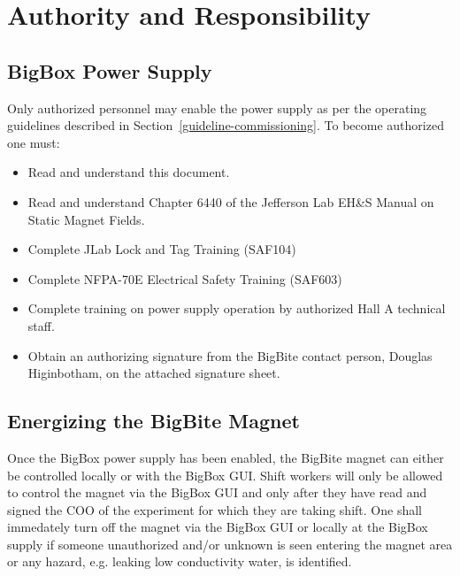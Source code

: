 \section{Authority and Responsibility}

\subsection{BigBox Power Supply}

Only authorized personnel may enable the power supply as per the operating
guidelines described in Section~\ref{guideline-commissioning}.  To become authorized one must:

\begin{itemize}

\item{Read and understand this document.}

\item{Read and understand Chapter 6440 of the Jefferson Lab EH\&S Manual on Static Magnet Fields.}

\item{Complete JLab Lock and Tag Training (SAF104)}

\item{Complete NFPA-70E Electrical Safety Training (SAF603)}

\item{Complete training on power supply operation by authorized Hall A technical staff.}

\item{Obtain an authorizing signature from the BigBite contact person, Douglas Higinbotham, on the
attached signature sheet.}

\end{itemize}

\subsection{Energizing the BigBite Magnet}

Once the BigBox power supply has been enabled, the BigBite magnet can either be
controlled locally or with the BigBox GUI.
Shift workers will only be allowed to control the magnet via the BigBox GUI and only after
they have read and signed the COO of the experiment for which they are taking shift.  
One shall immedately turn off the magnet via the BigBox GUI or locally at the BigBox supply 
if someone unauthorized and/or unknown is seen entering the magnet area or any hazard, e.g. leaking low conductivity water,
is identified.

